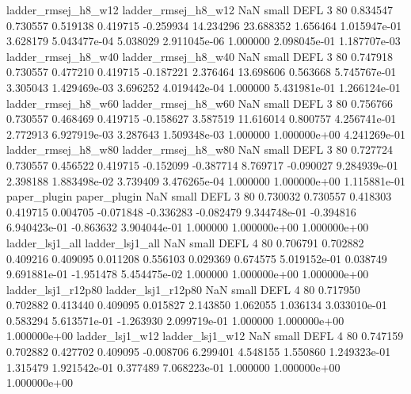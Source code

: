      ladder_rmsej_h8_w12      ladder_rmsej_h8_w12                   NaN      small     DEFL                 3 80 0.834547       0.730557 0.519138       0.419715   -0.259934     14.234296     23.688352     1.656464   1.015947e-01  3.628179 5.043477e-04     5.038029   2.911045e-06            1.000000    2.098045e-01        1.187707e-03
     ladder_rmsej_h8_w40      ladder_rmsej_h8_w40                   NaN      small     DEFL                 3 80 0.747918       0.730557 0.477210       0.419715   -0.187221      2.376464     13.698606     0.563668   5.745767e-01  3.305043 1.429469e-03     3.696252   4.019442e-04            1.000000    5.431981e-01        1.266124e-01
     ladder_rmsej_h8_w60      ladder_rmsej_h8_w60                   NaN      small     DEFL                 3 80 0.756766       0.730557 0.468469       0.419715   -0.158627      3.587519     11.616014     0.800757   4.256741e-01  2.772913 6.927919e-03     3.287643   1.509348e-03            1.000000    1.000000e+00        4.241269e-01
     ladder_rmsej_h8_w80      ladder_rmsej_h8_w80                   NaN      small     DEFL                 3 80 0.727724       0.730557 0.456522       0.419715   -0.152099     -0.387714      8.769717    -0.090027   9.284939e-01  2.398188 1.883498e-02     3.739409   3.476265e-04            1.000000    1.000000e+00        1.115881e-01
            paper_plugin             paper_plugin                   NaN      small     DEFL                 3 80 0.730032       0.730557 0.418303       0.419715    0.004705     -0.071848     -0.336283    -0.082479   9.344748e-01 -0.394816 6.940423e-01    -0.863632   3.904044e-01            1.000000    1.000000e+00        1.000000e+00
         ladder_lsj1_all          ladder_lsj1_all                   NaN      small     DEFL                 4 80 0.706791       0.702882 0.409216       0.409095    0.011208      0.556103      0.029369     0.674575   5.019152e-01  0.038749 9.691881e-01    -1.951478   5.454475e-02            1.000000    1.000000e+00        1.000000e+00
      ladder_lsj1_r12p80       ladder_lsj1_r12p80                   NaN      small     DEFL                 4 80 0.717950       0.702882 0.413440       0.409095    0.015827      2.143850      1.062055     1.036134   3.033010e-01  0.583294 5.613571e-01    -1.263930   2.099719e-01            1.000000    1.000000e+00        1.000000e+00
         ladder_lsj1_w12          ladder_lsj1_w12                   NaN      small     DEFL                 4 80 0.747159       0.702882 0.427702       0.409095   -0.008706      6.299401      4.548155     1.550860   1.249323e-01  1.315479 1.921542e-01     0.377489   7.068223e-01            1.000000    1.000000e+00        1.000000e+00
